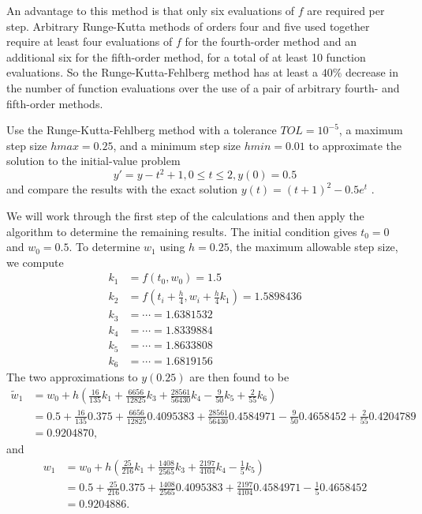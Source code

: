 \begin{property}
	An advantage to this method is that only six evaluations of $f$ are required per step. Arbitrary Runge-Kutta methods of orders four and five used together require at least four evaluations of $f$ for the fourth-order method and an additional six for the fifth-order method, for a total of at least 10 function evaluations. So the Runge-Kutta-Fehlberg method has at least a $40\%$ decrease in the number of function evaluations over the use of a pair of arbitrary fourth- and fifth-order methods.
\end{property}

\begin{ex}
	Use the Runge-Kutta-Fehlberg method with a tolerance $TOL = 10^{-5}$, a maximum step size $hmax = 0.25$, and a minimum step size $hmin = 0.01$ to approximate the solution to the initial-value problem
	\[ y' = y - t^2 + 1, 0 \leq t \leq 2, y(0) = 0.5 \]
	and compare the results with the exact solution $y(t) = (t + 1)^2 - 0.5e^t$ .
	
	\begin{solution}
		We will work through the first step of the calculations and then apply the algorithm to determine the remaining results. The initial condition gives $t_0 = 0$ and $w_0 = 0.5$. To determine $w_1$ using $h = 0.25$, the maximum allowable step size, we compute
		\begin{align*}
		k_1 &= f(t_0, w_0) = 1.5\\
		k_2 &= f\left(t_i + \frac{h}{4}, w_i +\frac{h}{4}k_1\right) = 1.5898436\\
		k_3 &= \cdots = 1.6381532\\
		k_4 &= \cdots = 1.8339884\\
		k_5 &= \cdots = 1.8633808\\
		k_6 &= \cdots = 1.6819156
		\end{align*}
		The two approximations to $y(0.25)$ are then found to be
		\begin{align*}
		\tilde{w}_{1} &= w_0 + h\left(\frac{16}{135}k_1 + \frac{6656}{12825}k_3 + \frac{28561}{56430}k_4 - \frac{9}{50}k_5 + \frac{2}{55}k_6\right)\\
		&= 0.5 + \frac{16}{135}0.375 + \frac{6656}{12825}0.4095383 + \frac{28561}{56430}0.4584971 - \frac{9}{50}0.4658452 + \frac{2}{55}0.4204789\\
		&= 0.9204870,
		\end{align*}
		and 
		\begin{align*}
		w_{1} &= w_0 + h\left(\frac{25}{216}k_1 + \frac{1408}{2565}k_3 + \frac{2197}{4104}k_4 - \frac{1}{5}k_5\right)\\
		&= 0.5 + \frac{25}{216}0.375 + \frac{1408}{2565}0.4095383 + \frac{2197}{4104}0.4584971 - \frac{1}{5}0.4658452\\
		&= 0.9204886.
		\end{align*}
		

\end{solution}
\end{ex}
